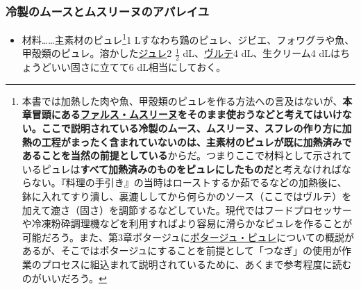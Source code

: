 \begin{recette}
\hypertarget{composition-de-l-appareil-pour-mousses-et-mousseline-froides}{%
\subsubsection{冷製のムースとムスリーヌのアパレイユ}\label{composition-de-l-appareil-pour-mousses-et-mousseline-froides}}



\begin{itemize}
\tightlist
\item
  材料\ldots{}\ldots{}主素材のピュレ\footnote{本書では加熱した肉や魚、甲殻類のピュレを作る方法への言及はないが、\textbf{本章冒頭にある\protect\hyperlink{farce-mousseline}{ファルス・ムスリーヌ}をそのまま使おうなどと考えてはいけない。ここで説明されている冷製のムース、ムスリーヌ、スフレの作り方に加熱の工程がまったく含まれていないのは、主素材のピュレが既に加熱済みであることを当然の前提としている}からだ。つまりここで材料として示されているピュレは\textbf{すべて加熱済みのものをピュレにしたものだ}と考えなければならない。『料理の手引き』の当時はローストするか茹でるなどの加熱後に、鉢に入れてすり潰し、裏漉ししてから何らかのソース（ここではヴルテ）を加えて漉さ（固さ）を調節するなどしていた。現代ではフードプロセッサーや冷凍粉砕調理機などを利用すればより容易に滑らかなピュレを作ることが可能だろう。また、第3章ポタージュに\protect\hyperlink{les-purees}{ポタージュ・ピュレ}についての概説があるが、そこではポタージュにすることを前提として「つなぎ」の使用が作業のプロセスに組込まれて説明されているために、あくまで参考程度に読むのがいいだろう。}1
  Lすなわち鶏のピュレ、ジビエ、フォワグラや魚、甲殻類のピュレ。溶かした\protect\hyperlink{gelees-ordinaires}{ジュレ}2
  \(\frac{1}{2}\) dL、\protect\hyperlink{veloute}{ヴルテ}4
  dL、生クリーム4 dLはちょうどいい固さに立てて6 dL相当にしておく。
\end{itemize}


\end{recette}
